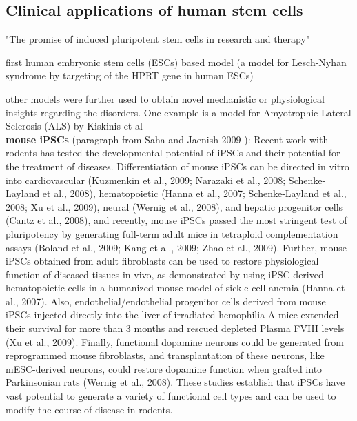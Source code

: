 \subsection{Clinical applications of human stem cells}
\label{sec:human_stem_cell_applications}

"The promise of induced pluripotent stem cells in research and therapy" \cite{robinton2012promise}

first human embryonic stem cells (ESCs) based model (a model for Lesch-Nyhan syndrome by targeting of the HPRT gene in human ESCs)\cite{urbach2004modeling}
\cite{halevy2014comparing}

other models were further used to obtain novel mechanistic or physiological insights regarding the disorders. One example is a model for Amyotrophic Lateral Sclerosis (ALS) by Kiskinis et al \cite{kiskinis2014pathways} \\


\textbf{mouse iPSCs} (paragraph from Saha and Jaenish 2009 \cite{saha2009technical}):
Recent work with rodents has tested the developmental potential of iPSCs and their potential for the treatment of diseases. 
Differentiation of mouse iPSCs can be directed in vitro into cardiovascular (Kuzmenkin et al., 2009; Narazaki et al., 2008; Schenke-Layland et al., 2008), hematopoietic (Hanna et al., 2007; Schenke-Layland et al., 2008; Xu et al., 2009), neural (Wernig et al., 2008), and hepatic progenitor cells (Cantz et al., 2008), and recently, mouse iPSCs passed the most stringent test of pluripotency by generating full-term adult mice in tetraploid complementation assays (Boland et al., 2009; Kang et al., 2009; Zhao et al., 2009). 
Further, mouse iPSCs obtained from adult fibroblasts can be used to restore physiological function of diseased tissues in vivo, as demonstrated by using iPSC-derived hematopoietic cells in a humanized mouse model of sickle cell anemia (Hanna et al., 2007). 
Also, endothelial/endothelial progenitor cells derived from mouse iPSCs injected directly into the liver of irradiated hemophilia A mice extended their survival for more than 3 months and rescued depleted Plasma FVIII levels (Xu et al., 2009). Finally, functional dopamine neurons could be generated from reprogrammed mouse fibroblasts, and transplantation of these neurons, like mESC-derived neurons, could restore dopamine function when grafted into Parkinsonian rats (Wernig et al., 2008). These studies establish that iPSCs have vast potential to generate a variety of functional cell types and can be used to modify the course of disease in rodents.\\

